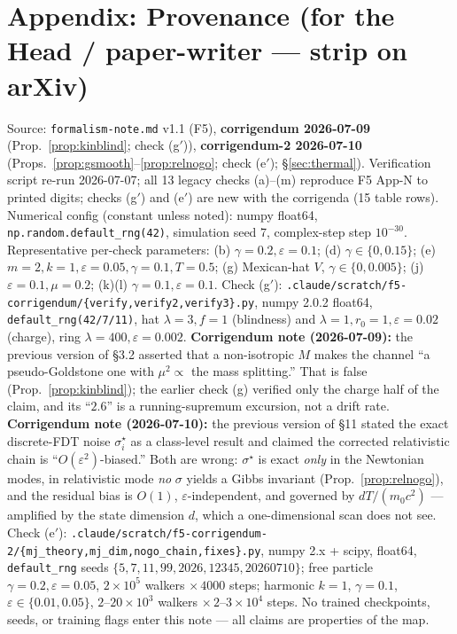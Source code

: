 \documentclass[11pt]{article}
\theoremstyle{plain}
\theoremstyle{definition}
\begin{document}
\section*{Appendix: Provenance (for the Head / paper-writer --- strip on arXiv)}
Source: \texttt{formalism-note.md} v1.1 (F5), \textbf{corrigendum 2026-07-09} (Prop.~\ref{prop:kinblind}; check (g$'$)), \textbf{corrigendum-2 2026-07-10} (Props.~\ref{prop:gsmooth}--\ref{prop:relnogo}; check (e$'$); \S\ref{sec:thermal}). Verification script re-run 2026-07-07; all 13 legacy checks (a)--(m) reproduce F5 App-N to printed digits; checks (g$'$) and (e$'$) are new with the corrigenda (15 table rows). Numerical config (constant unless noted): numpy float64, \texttt{np.random.default\_rng(42)}, simulation seed 7, complex-step step $10^{-30}$. Representative per-check parameters: (b) $\gamma=0.2,\varepsilon=0.1$; (d) $\gamma\in\{0,0.15\}$; (e) $m=2,k=1,\varepsilon=0.05,\gamma=0.1,T=0.5$; (g) Mexican-hat $V$, $\gamma\in\{0,0.005\}$; (j) $\varepsilon=0.1,\mu=0.2$; (k)(l) $\gamma=0.1,\varepsilon=0.1$. Check (g$'$): \texttt{.claude/scratch/f5-corrigendum/\{verify,verify2,verify3\}.py}, numpy 2.0.2 float64, \texttt{default\_rng(42/7/11)}, hat $\lambda=3,f=1$ (blindness) and $\lambda=1,r_0=1,\varepsilon=0.02$ (charge), ring $\lambda=400,\varepsilon=0.002$. \textbf{Corrigendum note (2026-07-09):} the previous version of \S3.2 asserted that a non-isotropic $M$ makes the channel ``a pseudo-Goldstone one with $\mu^2\propto$ the mass splitting.'' That is false (Prop.~\ref{prop:kinblind}); the earlier check (g) verified only the charge half of the claim, and its ``$2.6$'' is a running-supremum excursion, not a drift rate.
\textbf{Corrigendum note (2026-07-10):} the previous version of \S11 stated the exact discrete-FDT noise $\sigma_i^\star$ as a class-level result and claimed the corrected relativistic chain is ``$O(\varepsilon^2)$-biased.'' Both are wrong: $\sigma^\star$ is exact \emph{only} in the Newtonian modes, in relativistic mode \emph{no} $\sigma$ yields a Gibbs invariant (Prop.~\ref{prop:relnogo}), and the residual bias is $O(1)$, $\varepsilon$-independent, and governed by $dT/(m_0c^2)$ --- amplified by the state dimension $d$, which a one-dimensional scan does not see. Check (e$'$): \texttt{.claude/scratch/f5-corrigendum-2/\{mj\_theory,mj\_dim,nogo\_chain,fixes\}.py}, numpy 2.x + scipy, float64, \texttt{default\_rng} seeds $\{5,7,11,99,2026,12345,20260710\}$; free particle $\gamma{=}0.2,\varepsilon{=}0.05$, $2{\times}10^5$ walkers $\times\,4000$ steps; harmonic $k{=}1$, $\gamma{=}0.1$, $\varepsilon\in\{0.01,0.05\}$, $2$--$20{\times}10^3$ walkers $\times\,2$--$3{\times}10^4$ steps. No trained checkpoints, seeds, or training flags enter this note --- all claims are properties of the map.
\end{document}

